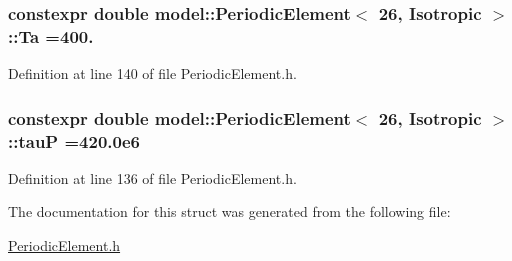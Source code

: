 \subsubsection[{Ta}]{\setlength{\rightskip}{0pt plus 5cm}constexpr double {\bf model\+::\+Periodic\+Element}$<$ 26, {\bf Isotropic} $>$\+::Ta =400.\hspace{0.3cm}{\ttfamily [static]}}\label{structmodel_1_1_periodic_element_3_0126_00_01_isotropic_01_4_aae1bee5b5d216f5064f2cfee92b4cb23}


Definition at line 140 of file Periodic\+Element.\+h.

\hypertarget{structmodel_1_1_periodic_element_3_0126_00_01_isotropic_01_4_ae8952577b9166dbce37389f3c45f529f}{}
\subsubsection[{tau\+P}]{\setlength{\rightskip}{0pt plus 5cm}constexpr double {\bf model\+::\+Periodic\+Element}$<$ 26, {\bf Isotropic} $>$\+::tau\+P =420.\+0e6\hspace{0.3cm}{\ttfamily [static]}}\label{structmodel_1_1_periodic_element_3_0126_00_01_isotropic_01_4_ae8952577b9166dbce37389f3c45f529f}


Definition at line 136 of file Periodic\+Element.\+h.



The documentation for this struct was generated from the following file\+:\begin{DoxyCompactItemize}
\item 
\hyperlink{_periodic_element_8h}{Periodic\+Element.\+h}\end{DoxyCompactItemize}
